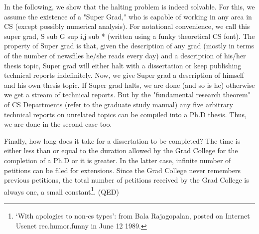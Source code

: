 In the following, we show that the halting problem is indeed solvable. For this, we assume the existence of a "Super Grad," who is capable of working in any area in CS (except possibly numerical analysis). For notational convenience, we call this super grad, S sub G sup i,j sub * (written using a funky theoretical CS font). The property of Super grad is that, given the description of any grad (mostly in terms of the number of newsfiles he/she reads every day) and a description of his/her thesis topic, Super grad will either halt with a dissertation or keep publishing technical reports indefinitely. Now, we give Super grad a description of himself and his own thesis topic. If Super grad halts, we are done (and so is he) otherwise we get a stream of technical reports. But by the "fundamental research theorem" of CS Departments (refer to the graduate study manual) any five arbitrary technical reports on unrelated topics can be compiled into a Ph.D thesis. Thus, we are done in the second case too.

Finally, how long does it take for a dissertation to be completed? The time is either less than or equal to the duration allowed by the Grad College for the completion of a Ph.D or it is greater. In the latter case, infinite number of petitions can be filed for extensions. Since the Grad College never remembers previous petitions, the total number of petitions received by the Grad College is always one, a small constant\footnote{`With apologies to non-cs types': from Bala Rajagopalan, posted on Internet Usenet rec.humor.funny in June 12 1989.}. (QED)
